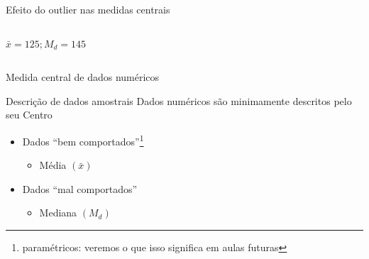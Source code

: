 \documentclass{beamer}
\begin{document}
\begin{frame}{\scriptsize Efeito do outlier nas medidas centrais}
\begin{columns}
\begin{column}{5cm}
\begin{center}
        \scriptsize
        \bigskip
        $\bar{x} = 125 ; M_d= 145$
      \end{center}
    \end{column}
  \end{columns}
\end{frame}

\begin{frame}{\scriptsize Medida central de dados numéricos}
  \begin{block}{Descrição de dados amostrais}
    \scriptsize
    Dados numéricos são minimamente descritos pelo seu Centro

    \bigskip
    \begin{itemize}
      \footnotesize
    \item Dados ``bem comportados''\footnote{\scriptsize paramétricos: veremos o que isso significa em aulas futuras}
      \begin{itemize}
        \scriptsize
      \item Média $\left( \bar{x} \right)$
      \end{itemize}
      \bigskip
    \item Dados ``mal comportados''
      \begin{itemize}
        \scriptsize
      \item Mediana $\left( M_d \right)$
      \end{itemize}
    \end{itemize}
  \end{block}
\end{frame}

\end{document}
